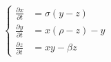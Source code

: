 \begin{align*}
  \begin{cases}
  \frac{\partial x}{\partial t} &= \sigma(y-z) \\
  \frac{\partial y}{\partial t} &= x(\rho-z)-y \\
  \frac{\partial z}{\partial t} &= xy - \beta z
  \end{cases}
\end{align*}
